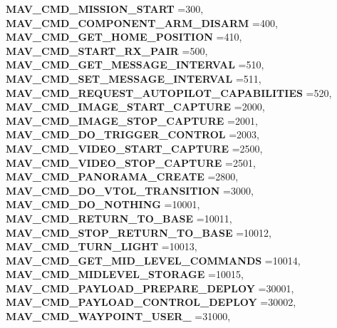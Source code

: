 \begin{DoxyCompactItemize}
\textbf{ M\+A\+V\+\_\+\+C\+M\+D\+\_\+\+M\+I\+S\+S\+I\+O\+N\+\_\+\+S\+T\+A\+RT} =300, 
\textbf{ M\+A\+V\+\_\+\+C\+M\+D\+\_\+\+C\+O\+M\+P\+O\+N\+E\+N\+T\+\_\+\+A\+R\+M\+\_\+\+D\+I\+S\+A\+RM} =400, 
\textbf{ M\+A\+V\+\_\+\+C\+M\+D\+\_\+\+G\+E\+T\+\_\+\+H\+O\+M\+E\+\_\+\+P\+O\+S\+I\+T\+I\+ON} =410, 
\newline
\textbf{ M\+A\+V\+\_\+\+C\+M\+D\+\_\+\+S\+T\+A\+R\+T\+\_\+\+R\+X\+\_\+\+P\+A\+IR} =500, 
\textbf{ M\+A\+V\+\_\+\+C\+M\+D\+\_\+\+G\+E\+T\+\_\+\+M\+E\+S\+S\+A\+G\+E\+\_\+\+I\+N\+T\+E\+R\+V\+AL} =510, 
\textbf{ M\+A\+V\+\_\+\+C\+M\+D\+\_\+\+S\+E\+T\+\_\+\+M\+E\+S\+S\+A\+G\+E\+\_\+\+I\+N\+T\+E\+R\+V\+AL} =511, 
\textbf{ M\+A\+V\+\_\+\+C\+M\+D\+\_\+\+R\+E\+Q\+U\+E\+S\+T\+\_\+\+A\+U\+T\+O\+P\+I\+L\+O\+T\+\_\+\+C\+A\+P\+A\+B\+I\+L\+I\+T\+I\+ES} =520, 
\newline
\textbf{ M\+A\+V\+\_\+\+C\+M\+D\+\_\+\+I\+M\+A\+G\+E\+\_\+\+S\+T\+A\+R\+T\+\_\+\+C\+A\+P\+T\+U\+RE} =2000, 
\textbf{ M\+A\+V\+\_\+\+C\+M\+D\+\_\+\+I\+M\+A\+G\+E\+\_\+\+S\+T\+O\+P\+\_\+\+C\+A\+P\+T\+U\+RE} =2001, 
\textbf{ M\+A\+V\+\_\+\+C\+M\+D\+\_\+\+D\+O\+\_\+\+T\+R\+I\+G\+G\+E\+R\+\_\+\+C\+O\+N\+T\+R\+OL} =2003, 
\textbf{ M\+A\+V\+\_\+\+C\+M\+D\+\_\+\+V\+I\+D\+E\+O\+\_\+\+S\+T\+A\+R\+T\+\_\+\+C\+A\+P\+T\+U\+RE} =2500, 
\newline
\textbf{ M\+A\+V\+\_\+\+C\+M\+D\+\_\+\+V\+I\+D\+E\+O\+\_\+\+S\+T\+O\+P\+\_\+\+C\+A\+P\+T\+U\+RE} =2501, 
\textbf{ M\+A\+V\+\_\+\+C\+M\+D\+\_\+\+P\+A\+N\+O\+R\+A\+M\+A\+\_\+\+C\+R\+E\+A\+TE} =2800, 
\textbf{ M\+A\+V\+\_\+\+C\+M\+D\+\_\+\+D\+O\+\_\+\+V\+T\+O\+L\+\_\+\+T\+R\+A\+N\+S\+I\+T\+I\+ON} =3000, 
\textbf{ M\+A\+V\+\_\+\+C\+M\+D\+\_\+\+D\+O\+\_\+\+N\+O\+T\+H\+I\+NG} =10001, 
\newline
\textbf{ M\+A\+V\+\_\+\+C\+M\+D\+\_\+\+R\+E\+T\+U\+R\+N\+\_\+\+T\+O\+\_\+\+B\+A\+SE} =10011, 
\textbf{ M\+A\+V\+\_\+\+C\+M\+D\+\_\+\+S\+T\+O\+P\+\_\+\+R\+E\+T\+U\+R\+N\+\_\+\+T\+O\+\_\+\+B\+A\+SE} =10012, 
\textbf{ M\+A\+V\+\_\+\+C\+M\+D\+\_\+\+T\+U\+R\+N\+\_\+\+L\+I\+G\+HT} =10013, 
\textbf{ M\+A\+V\+\_\+\+C\+M\+D\+\_\+\+G\+E\+T\+\_\+\+M\+I\+D\+\_\+\+L\+E\+V\+E\+L\+\_\+\+C\+O\+M\+M\+A\+N\+DS} =10014, 
\newline
\textbf{ M\+A\+V\+\_\+\+C\+M\+D\+\_\+\+M\+I\+D\+L\+E\+V\+E\+L\+\_\+\+S\+T\+O\+R\+A\+GE} =10015, 
\textbf{ M\+A\+V\+\_\+\+C\+M\+D\+\_\+\+P\+A\+Y\+L\+O\+A\+D\+\_\+\+P\+R\+E\+P\+A\+R\+E\+\_\+\+D\+E\+P\+L\+OY} =30001, 
\textbf{ M\+A\+V\+\_\+\+C\+M\+D\+\_\+\+P\+A\+Y\+L\+O\+A\+D\+\_\+\+C\+O\+N\+T\+R\+O\+L\+\_\+\+D\+E\+P\+L\+OY} =30002, 
\textbf{ M\+A\+V\+\_\+\+C\+M\+D\+\_\+\+W\+A\+Y\+P\+O\+I\+N\+T\+\_\+\+U\+S\+E\+R\+\_} =31000, 

\end{DoxyCompactItemize}

